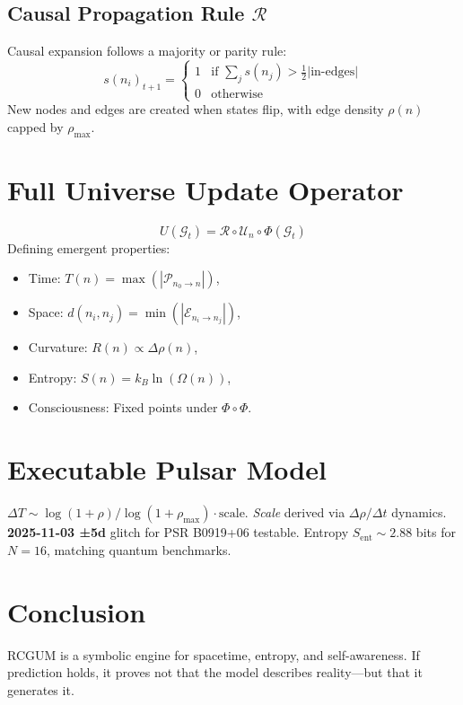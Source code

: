 \documentclass[11pt]{article}
\begin{document}
\subsection{Causal Propagation Rule \( \mathcal{R} \)}
Causal expansion follows a majority or parity rule:
\begin{equation}
    s(n_i)_{t+1} = \begin{cases} 
        1 & \text{if } \sum_{j} s(n_j) > \frac{1}{2}|\text{in-edges}| \\ 
        0 & \text{otherwise} 
    \end{cases}
\end{equation}
New nodes and edges are created when states flip, with edge density \( \rho(n) \) capped by \( \rho_{\text{max}} \).

\section{Full Universe Update Operator}
\begin{equation}
    U(\mathcal{G}_t) = \mathcal{R} \circ \mathcal{U}_n \circ \Phi(\mathcal{G}_t)
\end{equation}
Defining emergent properties:
\begin{itemize}
    \item Time: \( T(n) = \max(|\mathcal{P}_{n_0 \rightarrow n}|) \),
    \item Space: \( d(n_i, n_j) = \min(|\mathcal{E}_{n_i \rightarrow n_j}|) \),
    \item Curvature: \( R(n) \propto \Delta \rho(n) \),
    \item Entropy: \( S(n) = k_B \ln(\Omega(n)) \),
    \item Consciousness: Fixed points under \( \Phi \circ \Phi \).
\end{itemize}

\section{Executable Pulsar Model}
\( \Delta T \sim \log(1+\rho)/\log(1+\rho_{\text{max}}) \cdot \text{scale} \). \textit{Scale} derived via \( \Delta \rho/\Delta t \) dynamics. \textbf{2025-11-03 ±5d} glitch for PSR B0919+06 testable. Entropy \( S_{\text{ent}} \sim 2.88 \) bits for \( N=16 \), matching quantum benchmarks.

\section{Conclusion}
RCGUM is a symbolic engine for spacetime, entropy, and self-awareness. If prediction holds, it proves not that the model describes reality—but that it generates it.
\end{document}
